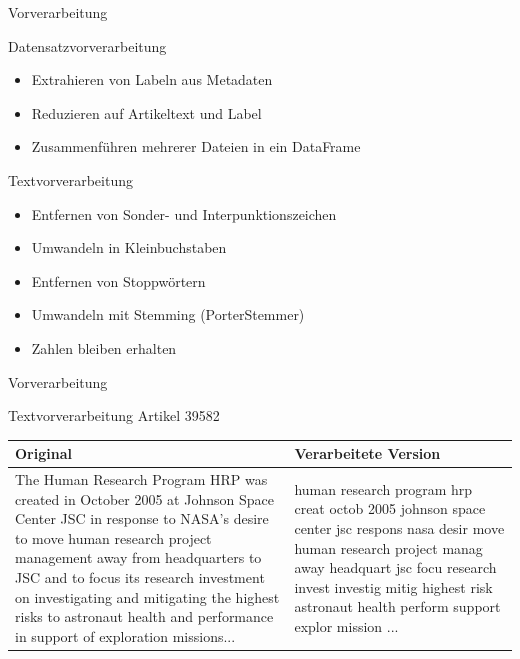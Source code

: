 \documentclass[aspectratio=169]{beamer} %
\begin{document}
\begin{frame}{Vorverarbeitung}
    \begin{block}{Datensatzvorverarbeitung}
        \begin{itemize}
            \item Extrahieren von Labeln aus Metadaten
            \item Reduzieren auf Artikeltext und Label
            \item Zusammenführen mehrerer Dateien in ein DataFrame
        \end{itemize}
    \end{block}
    \begin{block}{Textvorverarbeitung}
        \begin{itemize}
            \item Entfernen von Sonder- und Interpunktionszeichen
            \item Umwandeln in Kleinbuchstaben
            \item Entfernen von Stoppwörtern
            \item Umwandeln mit Stemming (PorterStemmer)
            \item Zahlen bleiben erhalten
        \end{itemize}
    \end{block}
\end{frame}

\begin{frame}{Vorverarbeitung}
    \begin{exampleblock}{Textvorverarbeitung Artikel 39582}
        \begin{tabularx}{\textwidth}{>{\raggedright\arraybackslash}X >{\raggedright\arraybackslash}X}
            \textbf{Original} & \textbf{Verarbeitete Version}                                                                                                                                                                                                 \\ \hline
            The Human Research Program HRP was created in October 2005 at Johnson Space Center JSC in response to NASA's desire to move human research project management away from headquarters to JSC and to focus its research investment on investigating and mitigating the highest risks to astronaut health and performance in support of exploration missions...
                              &
            human research program hrp creat octob 2005 johnson space center jsc respons nasa desir move human research project manag away headquart jsc focu research invest investig mitig highest risk astronaut health perform support explor mission ... \\
        \end{tabularx}
    \end{exampleblock}
\end{frame}
\end{document}
